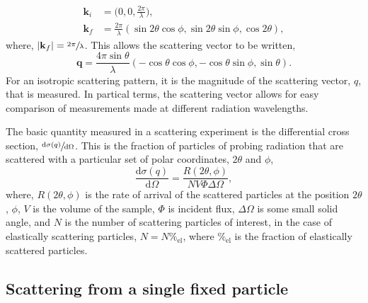 %
\begin{equation}
	\begin{aligned}
		\mathbf{k}_i & = \bigg(0, 0, \frac{2\pi}{\lambda}\bigg), \\
		\mathbf{k}_f & = \frac{2\pi}{\lambda}(\sin{2\theta}\cos{\phi}, \sin{2\theta}\sin{\phi}, \cos{2\theta}),
	\end{aligned}
\end{equation}
%
where, $|\mathbf{k}_f| = \sfrac{2\pi}{\lambda}$. This allows the scattering vector to be written,
%
\begin{equation}
	\mathbf{q} = \frac{4\pi\sin{\theta}}{\lambda}(-\cos{\theta}\cos{\phi}, -\cos{\theta}\sin{\phi},\sin{\theta}).
\end{equation}
%
For an isotropic scattering pattern, it is the magnitude of the scattering vector, $q$, that is measured.
In partical terms, the scattering vector allows for easy comparison of measurements made at different radiation wavelengths.

The basic quantity measured in a scattering experiment is the differential cross section, $\sfrac{\text{d}\sigma(q)}{\text{d}\Omega}$.
This is the fraction of particles of probing radiation that are scattered with a particular set of polar coordinates, $2\theta$ and $\phi$,
%
\begin{equation}
	\frac{\text{d}\sigma(q)}{\text{d}\Omega} = \frac{R(2\theta,\phi)}{NV\Phi\Delta \Omega},
	\label{equ:dsc}
\end{equation}
%
where, $R(2\theta,\phi)$ is the rate of arrival of the scattered particles at the position $2\theta$, $\phi$, $V$ is the volume of the sample, $\Phi$ is incident flux, $\Delta \Omega$ is some small solid angle, and $N$ is the number of scattering particles of interest, in the case of elastically scattering particles, $N = N\%_{\text{el}}$, where $\%_{\text{el}}$ is the fraction of elastically scattered particles.

\subsection{Scattering from a single fixed particle}

